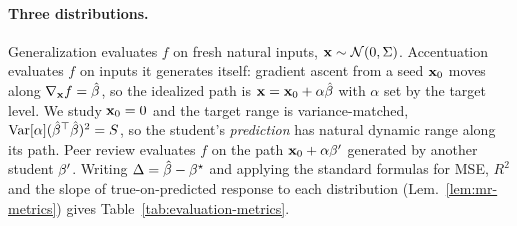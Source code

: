 \paragraph{Three distributions.}
Generalization evaluates $f$ on fresh natural inputs, $\mathbf{x}\sim\mathcal N(0,\Sigma)$. Accentuation evaluates $f$ on inputs it generates itself: gradient ascent from a seed $\mathbf{x}_0$ moves along $\nabla_{\mathbf{x}} f=\hat{\beta}$, so the idealized path is $\mathbf{x}=\mathbf{x}_0+\alpha\hat{\beta}$ with $\alpha$ set by the target level. %
We study $\mathbf{x}_0=0$ and the target range is variance-matched, $\mathrm{Var}[\alpha]({\hat{\beta}}^\top\hat{\beta})^2=S$, so the student's \emph{prediction} has natural dynamic range along its path. Peer review evaluates $f$ on the path $\mathbf{x}_0+\alpha{\beta^{\prime}}$ generated by another student ${\beta^{\prime}}$. Writing $\Delta=\hat{\beta}-{\beta^{\star}}$ and applying the standard formulas for MSE, $R^2$ and the slope of true-on-predicted response to each distribution (Lem.~\ref{lem:mr-metrics}) gives Table~\ref{tab:evaluation-metrics}.

